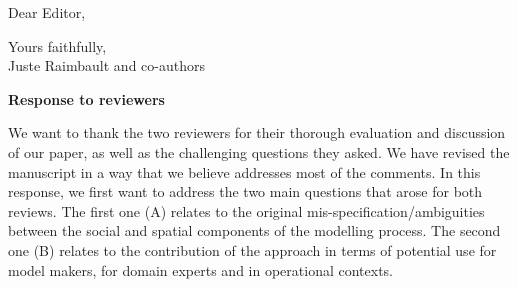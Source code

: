 \documentclass[11pt,a4paper,sans]{moderncv}        %
\begin{document}
\date{\today}
\opening{Dear Editor,}
\closing{Yours faithfully,\\
Juste Raimbault and co-authors%
}




\justify



\textbf{Response to reviewers}


\bigskip

We want to thank the two reviewers for their thorough evaluation and discussion of our paper, as well as the challenging questions they asked. We have revised the manuscript in a way that we believe addresses most of the comments. In this response, we first want to address the two main questions that arose for both reviews. The first one (A) relates to the original mis-specification/ambiguities between the social and spatial components of the modelling process. The second one (B) relates to the contribution of the approach in terms of potential use for model makers, for domain experts and in operational contexts.
\end{document}
